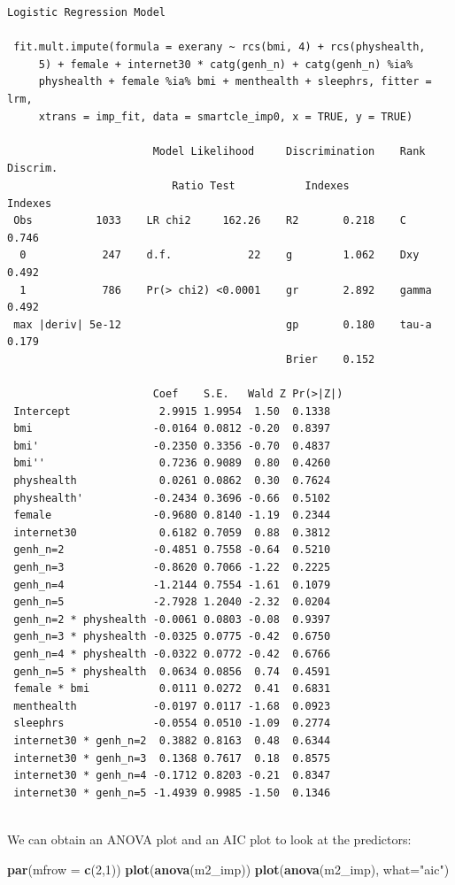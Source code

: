 \documentclass[]{book}
\newenvironment{Shaded}{\begin{snugshade}}{\end{snugshade}}
\newcommand{\KeywordTok}[1]{\textcolor[rgb]{0.13,0.29,0.53}{\textbf{#1}}}
\newcommand{\DataTypeTok}[1]{\textcolor[rgb]{0.13,0.29,0.53}{#1}}
\newcommand{\DecValTok}[1]{\textcolor[rgb]{0.00,0.00,0.81}{#1}}
\newcommand{\StringTok}[1]{\textcolor[rgb]{0.31,0.60,0.02}{#1}}
\newcommand{\NormalTok}[1]{#1}
\theoremstyle{definition}
\theoremstyle{definition}
\theoremstyle{definition}
\theoremstyle{remark}
\begin{document}
\begin{verbatim}
Logistic Regression Model
 
 fit.mult.impute(formula = exerany ~ rcs(bmi, 4) + rcs(physhealth, 
     5) + female + internet30 * catg(genh_n) + catg(genh_n) %ia% 
     physhealth + female %ia% bmi + menthealth + sleephrs, fitter = lrm, 
     xtrans = imp_fit, data = smartcle_imp0, x = TRUE, y = TRUE)
 
                       Model Likelihood     Discrimination    Rank Discrim.    
                          Ratio Test           Indexes           Indexes       
 Obs          1033    LR chi2     162.26    R2       0.218    C       0.746    
  0            247    d.f.            22    g        1.062    Dxy     0.492    
  1            786    Pr(> chi2) <0.0001    gr       2.892    gamma   0.492    
 max |deriv| 5e-12                          gp       0.180    tau-a   0.179    
                                            Brier    0.152                     
 
                       Coef    S.E.   Wald Z Pr(>|Z|)
 Intercept              2.9915 1.9954  1.50  0.1338  
 bmi                   -0.0164 0.0812 -0.20  0.8397  
 bmi'                  -0.2350 0.3356 -0.70  0.4837  
 bmi''                  0.7236 0.9089  0.80  0.4260  
 physhealth             0.0261 0.0862  0.30  0.7624  
 physhealth'           -0.2434 0.3696 -0.66  0.5102  
 female                -0.9680 0.8140 -1.19  0.2344  
 internet30             0.6182 0.7059  0.88  0.3812  
 genh_n=2              -0.4851 0.7558 -0.64  0.5210  
 genh_n=3              -0.8620 0.7066 -1.22  0.2225  
 genh_n=4              -1.2144 0.7554 -1.61  0.1079  
 genh_n=5              -2.7928 1.2040 -2.32  0.0204  
 genh_n=2 * physhealth -0.0061 0.0803 -0.08  0.9397  
 genh_n=3 * physhealth -0.0325 0.0775 -0.42  0.6750  
 genh_n=4 * physhealth -0.0322 0.0772 -0.42  0.6766  
 genh_n=5 * physhealth  0.0634 0.0856  0.74  0.4591  
 female * bmi           0.0111 0.0272  0.41  0.6831  
 menthealth            -0.0197 0.0117 -1.68  0.0923  
 sleephrs              -0.0554 0.0510 -1.09  0.2774  
 internet30 * genh_n=2  0.3882 0.8163  0.48  0.6344  
 internet30 * genh_n=3  0.1368 0.7617  0.18  0.8575  
 internet30 * genh_n=4 -0.1712 0.8203 -0.21  0.8347  
 internet30 * genh_n=5 -1.4939 0.9985 -1.50  0.1346  
 
\end{verbatim}

We can obtain an ANOVA plot and an AIC plot to look at the predictors:

\begin{Shaded}
\begin{Highlighting}[]
\KeywordTok{par}\NormalTok{(}\DataTypeTok{mfrow =} \KeywordTok{c}\NormalTok{(}\DecValTok{2}\NormalTok{,}\DecValTok{1}\NormalTok{))}
\KeywordTok{plot}\NormalTok{(}\KeywordTok{anova}\NormalTok{(m2_imp))}
\KeywordTok{plot}\NormalTok{(}\KeywordTok{anova}\NormalTok{(m2_imp), }\DataTypeTok{what=}\StringTok{"aic"}\NormalTok{)}
\end{Highlighting}
\end{Shaded}
\end{document}
